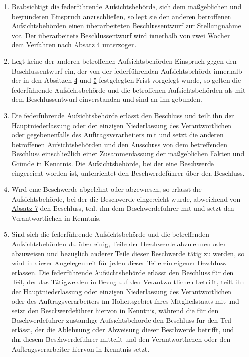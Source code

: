 \begin{enumerate}
  \item Beabsichtigt die federführende Aufsichtsbehörde, sich dem maßgeblichen und begründeten Einspruch anzuschließen,
   so legt sie den anderen betroffenen Aufsichtsbehörden einen überarbeiteten Beschlussentwurf zur Stellungnahme vor.
   Der überarbeitete Beschlussentwurf wird innerhalb von zwei Wochen dem Verfahren nach \hyperref[itm:60-4]{Absatz 4}
   unterzogen.
  \label{itm:60-5}

  \item Legt keine der anderen betroffenen Aufsichtsbehörden Einspruch gegen den Beschlussentwurf ein, der von der
   federführenden Aufsichtsbehörde innerhalb der in den Absätzen \hyperref[itm:60-4]{4} und \hyperref[itm:60-5]
   {5} festgelegten Frist vorgelegt wurde, so gelten die federführende Aufsichtsbehörde und die betroffenen
   Aufsichtsbehörden als mit dem Beschlussentwurf einverstanden und sind an ihn gebunden.
  \label{itm:60-6}

  \item Die federführende Aufsichtsbehörde erlässt den Beschluss und teilt ihn der Hauptniederlassung oder der einzigen
   Niederlassung des Verantwortlichen oder gegebenenfalls des Auftragsverarbeiters mit und setzt die anderen
   betroffenen Aufsichtsbehörden und den Ausschuss von dem betreffenden Beschluss einschließlich einer Zusammenfassung
   der maßgeblichen Fakten und Gründe in Kenntnis. Die Aufsichtsbehörde, bei der eine Beschwerde eingereicht worden
   ist, unterrichtet den Beschwerdeführer über den Beschluss.
  \label{itm:60-7}

  \item Wird eine Beschwerde abgelehnt oder abgewiesen, so erlässt die Aufsichtsbehörde, bei der die Beschwerde
   eingereicht wurde, abweichend von \hyperref[itm:60-7]{Absatz 7} den Beschluss, teilt ihn dem Beschwerdeführer mit
   und setzt den Verantwortlichen in Kenntnis.
  \label{itm:60-8}

  \item Sind sich die federführende Aufsichtsbehörde und die betreffenden Aufsichtsbehörden darüber einig, Teile der
   Beschwerde abzulehnen oder abzuweisen und bezüglich anderer Teile dieser Beschwerde tätig zu werden, so wird in
   dieser Angelegenheit für jeden dieser Teile ein eigener Beschluss erlassen. Die federführende Aufsichtsbehörde
   erlässt den Beschluss für den Teil, der das Tätigwerden in Bezug auf den Verantwortlichen betrifft, teilt ihn der
   Hauptniederlassung oder einzigen Niederlassung des Verantwortlichen oder des Auftragsverarbeiters im Hoheitsgebiet
   ihres Mitgliedstaats mit und setzt den Beschwerdeführer hiervon in Kenntnis, während die für den Beschwerdeführer
   zuständige Aufsichtsbehörde den Beschluss für den Teil erlässt, der die Ablehnung oder Abweisung dieser Beschwerde
   betrifft, und ihn diesem Beschwerdeführer mitteilt und den Verantwortlichen oder den Auftragsverarbeiter hiervon in
   Kenntnis setzt.
  \label{itm:60-9}


\end{enumerate}
